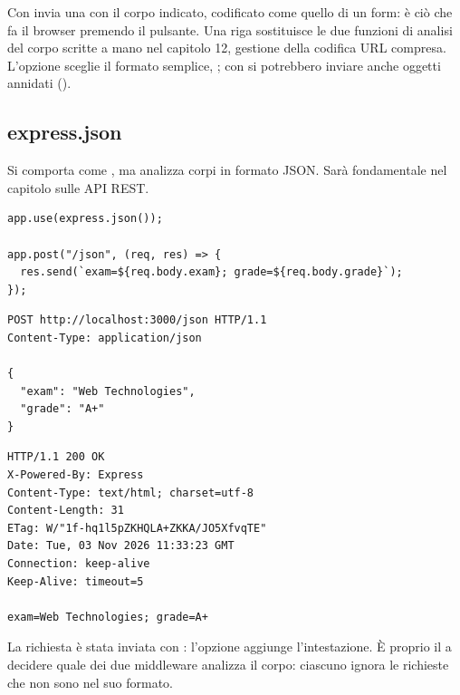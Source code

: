 
Con   invia una  con il corpo indicato, codificato
come quello di un form: è ciò che fa il browser premendo il pulsante. Una riga
sostituisce le due funzioni di analisi del corpo scritte a mano nel
capitolo 12, gestione della codifica URL compresa. L'opzione
 sceglie il formato semplice, ; con
 si potrebbero inviare anche oggetti annidati ().

\subsection{express.json}

Si comporta come , ma analizza corpi in formato JSON.
Sarà fondamentale nel capitolo sulle API REST.

\begin{lstlisting}[style=js]
app.use(express.json());

app.post("/json", (req, res) => {
  res.send(`exam=${req.body.exam}; grade=${req.body.grade}`);
});
\end{lstlisting}

\begin{affianco}[0.5]
\begin{lstlisting}[style=http, name=Richiesta]
POST http://localhost:3000/json HTTP/1.1
Content-Type: application/json

{
  "exam": "Web Technologies",
  "grade": "A+"
}
\end{lstlisting}
\risultato
\begin{lstlisting}[style=http, name=Risposta]
HTTP/1.1 200 OK
X-Powered-By: Express
Content-Type: text/html; charset=utf-8
Content-Length: 31
ETag: W/"1f-hq1l5pZKHQLA+ZKKA/JO5XfvqTE"
Date: Tue, 03 Nov 2026 11:33:23 GMT
Connection: keep-alive
Keep-Alive: timeout=5

exam=Web Technologies; grade=A+
\end{lstlisting}
\end{affianco}

La richiesta è stata inviata con
:
l'opzione  aggiunge l'intestazione. È proprio il 
a decidere quale dei due middleware analizza il corpo: ciascuno ignora le
richieste che non sono nel suo formato.

